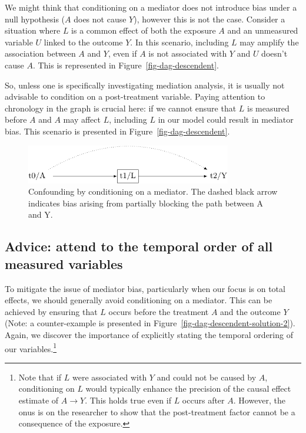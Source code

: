 \documentclass[
  singlecolumn]{report}
\begin{document}
We might think that conditioning on a mediator does not introduce bias
under a null hypothesis (\(A\) does not cause \(Y\)), however this is
not the case. Consider a situation where \(L\) is a common effect of
both the exposure \(A\) and an unmeasured variable \(U\) linked to the
outcome \(Y\). In this scenario, including \(L\) may amplify the
association between \(A\) and \(Y\), even if \(A\) is not associated
with \(Y\) and \(U\) doesn't cause \(A\). This is represented in
Figure~\ref{fig-dag-descendent}.

So, unless one is specifically investigating mediation analysis, it is
usually not advisable to condition on a post-treatment variable. Paying
attention to chronology in the graph is crucial here: if we cannot
ensure that \(L\) is measured before \(A\) and \(A\) may affect \(L\),
including \(L\) in our model could result in mediator bias. This
scenario is presented in Figure~\ref{fig-dag-descendent}.

\begin{figure}

{\centering \includegraphics[width=0.8\textwidth,height=\textheight]{causal-dags_files/figure-pdf/fig-dag-mediator-1.pdf}

}

\caption{\label{fig-dag-mediator}Confounding by conditioning on a
mediator. The dashed black arrow indicates bias arising from partially
blocking the path between A and Y.}

\end{figure}

\hypertarget{advice-attend-to-the-temporal-order-of-all-measured-variables-2}{%
\subsection{Advice: attend to the temporal order of all measured
variables}\label{advice-attend-to-the-temporal-order-of-all-measured-variables-2}}

To mitigate the issue of mediator bias, particularly when our focus is
on total effects, we should generally avoid conditioning on a mediator.
This can be achieved by ensuring that \(L\) occurs before the treatment
\(A\) and the outcome \(Y\) (Note: a counter-example is presented in
Figure~\ref{fig-dag-descendent-solution-2}). Again, we discover the
importance of explicitly stating the temporal ordering of our
variables.\footnote{Note that if \(L\) were associated with \(Y\) and
  could not be caused by \(A\), conditioning on \(L\) would typically
  enhance the precision of the causal effect estimate of \(A \to Y\).
  This holds true even if \(L\) occurs after \(A\). However, the onus is
  on the researcher to show that the post-treatment factor cannot be a
  consequence of the exposure.}
\end{document}
